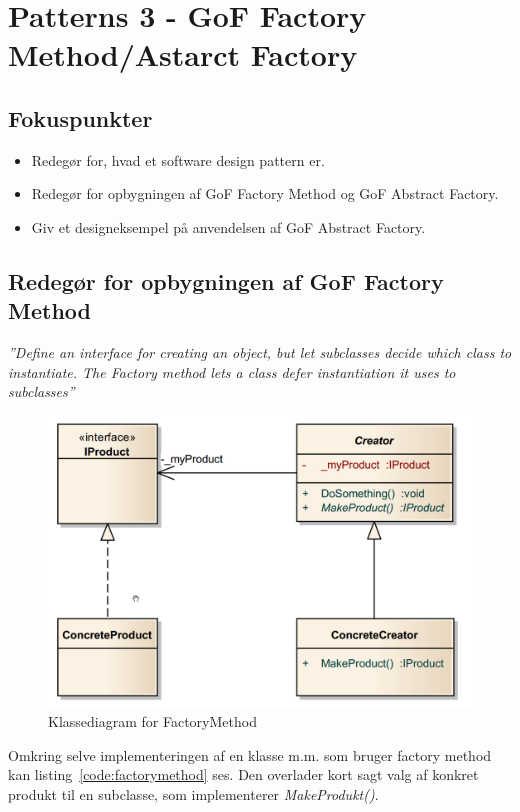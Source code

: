 \section{Patterns 3 - GoF Factory Method/Astarct Factory}

\subsection{Fokuspunkter}

\begin{itemize}
	\item Redegør for, hvad et software design pattern er.
	\item Redegør for opbygningen af GoF Factory Method og GoF Abstract Factory.
	\item Giv et designeksempel på anvendelsen af GoF Abstract Factory.
\end{itemize}



\subsection{Redegør for opbygningen af GoF Factory Method}

\textit{''Define an interface for creating an object, but let subclasses decide which class to instantiate. The Factory method lets a class defer instantiation it uses to subclasses''}

\begin{figure}[H]
	\centering
	\includegraphics[width=0.6\linewidth]{figs/facmet}
	\caption{Klassediagram for FactoryMethod}
	\label{fig:facmet}
\end{figure}

Omkring selve implementeringen af en klasse m.m. som bruger factory method kan listing~\ref{code:factorymethod} ses. Den overlader kort sagt valg af konkret produkt til en subclasse, som implementerer \textit{MakeProdukt()}.

